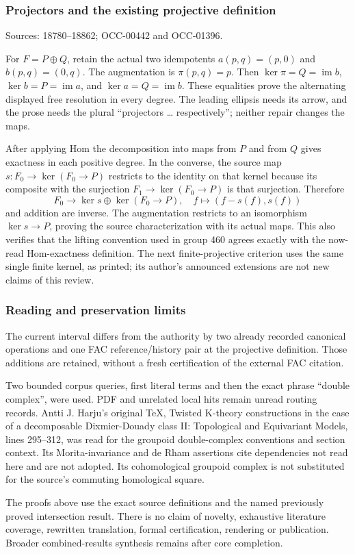 \subsubsection{Projectors and the existing projective definition}\label{algebra-proof-008-projectors-and-the-existing-projective-definition}

Sources: 18780--18862; OCC-00442 and OCC-01396.

For \(F=P\oplus Q\), retain the actual two idempotents \(a(p,q)=(p,0)\) and \(b(p,q)=(0,q)\). The augmentation is \(\pi(p,q)=p\). Then \(\ker\pi=Q=\operatorname{im}b\), \(\ker b=P=\operatorname{im}a\), and \(\ker a=Q=\operatorname{im}b\). These equalities prove the alternating displayed free resolution in every degree. The leading ellipsis needs its arrow, and the prose needs the plural ``projectors \ldots{} respectively''; neither repair changes the maps.

After applying Hom the decomposition into maps from \(P\) and from \(Q\) gives exactness in each positive degree. In the converse, the source map \(s:F_0\to\ker(F_0\to P)\) restricts to the identity on that kernel because its composite with the surjection \(F_1\to\ker(F_0\to P)\) is that surjection. Therefore \[
F_0\longrightarrow\ker s\oplus\ker(F_0\to P),\quad
f\longmapsto(f-s(f),s(f))
\] and addition are inverse. The augmentation restricts to an isomorphism \(\ker s\to P\), proving the source characterization with its actual maps. This also verifies that the lifting convention used in group 460 agrees exactly with the now-read Hom-exactness definition. The next finite-projective criterion uses the same single finite kernel, as printed; its author's announced extensions are not new claims of this review.

\subsubsection{Reading and preservation limits}\label{algebra-proof-008-reading-and-preservation-limits}

The current interval differs from the authority by two already recorded canonical operations and one FAC reference/history pair at the projective definition. Those additions are retained, without a fresh certification of the external FAC citation.

Two bounded corpus queries, first literal terms and then the exact phrase ``double complex'', were used. PDF and unrelated local hits remain unread routing records. Antti J. Harju's original TeX, Twisted K-theory constructions in the case of a decomposable Dixmier-Douady class II: Topological and Equivariant Models, lines 295--312, was read for the groupoid double-complex conventions and section context. Its Morita-invariance and de Rham assertions cite dependencies not read here and are not adopted. Its cohomological groupoid complex is not substituted for the source's commuting homological square.

The proofs above use the exact source definitions and the named previously proved intersection result. There is no claim of novelty, exhaustive literature coverage, rewritten translation, formal certification, rendering or publication. Broader combined-results synthesis remains after core completion.
